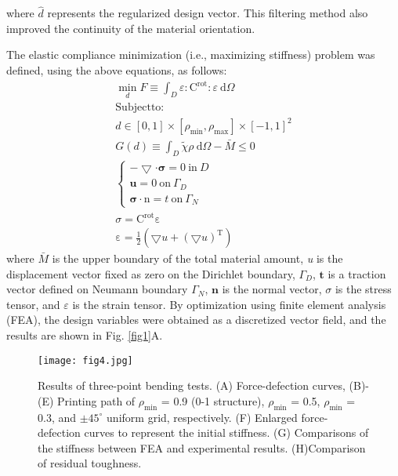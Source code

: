 \documentclass[a4paper,7pt,fleqn]{article}   %
\begin{document}
\begin{multicols}{2}
		where $\hat{d}$ represents the regularized design vector. This filtering method
		also improved the continuity of the material orientation.  \par  %
		The elastic compliance minimization (i.e., maximizing stiffness)
		problem was defined, using the above equations, as follows:
		\begin{subequations}
			\begin{align}
				\min_{d} F\equiv \int_{D}\varepsilon : \mathrm{C}^{\mathrm{rot}}: \varepsilon\ \mathrm{d}\Omega
				\label{eq10a}\\
				\mathrm{Subject to:}\\
				d\in [0,1]\times [\rho _{\min},\rho _{\max}]\times [-1,1]^{2}   
				\label{eq10b} \\
				G(d)\equiv \int_{D}\tilde{\chi}\rho\ \mathrm{d}\Omega -\bar{M} \le 0
				\label{eq10c}\\
				\left\{\begin{matrix}-\bigtriangledown \cdot \mathbf{\sigma}  =0\ \mathrm{in}\ D 
					\\\mathbf{u} =0\ \mathrm{on}\ \mathit{\Gamma}_{D} 
					\\\mathbf{\sigma}  \cdot \mathbf{\mathrm{n}} =t \ \mathrm{on}\ \mathit{\Gamma}_{N} \end{matrix}\right.
				\label{eq10d}\\
				\sigma =\mathrm{C} ^{\mathrm{rot}} \mathrm{\varepsilon}
				\label{eq10e}\\
				\mathrm{\varepsilon } =\frac{1}{2}(\bigtriangledown u+(\bigtriangledown u)^{\mathrm{T}})
				\label{eq10f}
			\end{align}
		\end{subequations}
		where $\bar{M} $ is the upper boundary of the total material amount, \emph{u} is the
		displacement vector fixed as zero on the Dirichlet boundary, $\mathit{\Gamma _{D}}$, $\bm{t}$ is a traction vector defined on Neumann boundary $\mathit{\Gamma _{N}}$, $\bm{n}$ is the normal vector, $\sigma$ is the stress tensor, and $\varepsilon$ is the strain tensor. By optimization using finite element analysis (FEA), the design variables were obtained as a discretized vector field, and the results are shown in Fig. \ref{fig1}A.
		\begin{figure*}[t!]
			\centering
			\texttt{[image: fig4.jpg]}
			\caption{\small Results of three-point bending tests. (A) Force-defection curves, (B)-(E) Printing path of $\rho_{\min}$ = 0.9 (0-1 structure), $\rho_{\min}$ = 0.5, $\rho_{\min}$ = 0.3, and $\pm45^{\circ}$ uniform grid, respectively. (F) Enlarged force-defection curves to represent the initial stiffness. (G) Comparisons of the stiffness between FEA and experimental results. (H)Comparison of residual toughness.}
			\label{fig4}
		\end{figure*}
		

\end{multicols}
\end{document}
